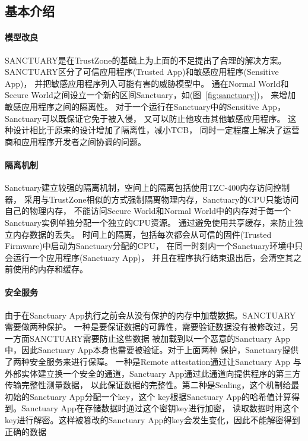 \subsection{基本介绍}
\paragraph{模型改良}
SANCTUARY\cite{sanctuary-p1}是在TrustZone的基础上为上面的不足提出了合理的解决方案。 
SANCTUARY区分了可信应用程序(Trusted App)和敏感应用程序(Sensitive App)，
并把敏感应用程序列入可能有害的威胁模型中。
通在Normal World和Secure World之间设立一个新的区间Sanctuary，如(图~\ref{fig:sanctuary})，
来增加敏感应用程序之间的隔离性。
对于一个运行在Sanctuary中的Sensitive App，Sanctuary可以既保证它免于被入侵，
又可以防止他攻击其他敏感应用程序。
这种设计相比于原来的设计增加了隔离性，减小TCB，
同时一定程度上解决了运营商和应用程序开发者之间协调的问题。

\paragraph{隔离机制}
Sanctuary建立较强的隔离机制，空间上的隔离包括使用TZC-400内存访问控制器，
采用与TrustZone相似的方式强制隔离物理内存，Sanctuary的CPU只能访问自己的物理内存，
不能访问Secure World和Normal World中的内存对于每一个Sanctuary实例单独分配一个独立的CPU资源。
通过避免使用共享缓存，来防止独立内存数据的丢失。
时间上的隔离，包括每次都会从可信的固件(Trusted Firmware)中启动为Sanctuary分配的CPU\cite{trustZone-p1}，
在同一时刻内一个Sanctuary环境中只会运行一个应用程序(Sanctuary App)，
并且在程序执行结束退出后，会清空其之前使用的内存和缓存。

\paragraph{安全服务}
由于在Sanctuary App执行之前会从没有保护的内存中加载数据。SANCTUARY需要做两种保护。
一种是要保证数据的可靠性，需要验证数据没有被修改过，另一方面SANCTUARY需要防止这些数据
被加载到以一个恶意的Sanctuary App中，因此Sanctuary App本身也需要被验证。对于上面两种
保护，Sanctuary提供了两种安全服务来进行保障。 一种是Remote attestation通过让Sanctuary App
与外部实体建立换一个安全的通道，Sanctuary App通过此通道向提供程序的第三方传输完整性测量数据，
以此保证数据的完整性。第二种是Sealing，这个机制给最初始的Sanctuary App分配一个key，这个
key根据Sanctuary App的哈希值计算得到。Sanctuary App在存储数据时通过这个密钥key进行加密，
读取数据时用这个key进行解密。这样被篡改的Sanctuary App的key会发生变化，因此不能解密得到
正确的数据

